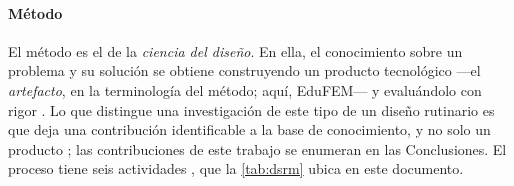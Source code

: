 \paragraph{Método} El método es el de la \emph{ciencia del diseño}. En ella, el conocimiento sobre un problema y su solución se obtiene construyendo un producto tecnológico —el \emph{artefacto}, en la terminología del método; aquí, EduFEM— y evaluándolo con rigor \autocite[pp.~75, 83]{hevner2004design}. Lo que distingue una investigación de este tipo de un diseño rutinario es que deja una contribución identificable a la base de conocimiento, y no solo un producto \autocite[p.~81]{hevner2004design}; las contribuciones de este trabajo se enumeran en las Conclusiones. El proceso tiene seis actividades \autocite[pp.~52-56]{peffers2007dsrm}, que la \autoref{tab:dsrm} ubica en este documento.

